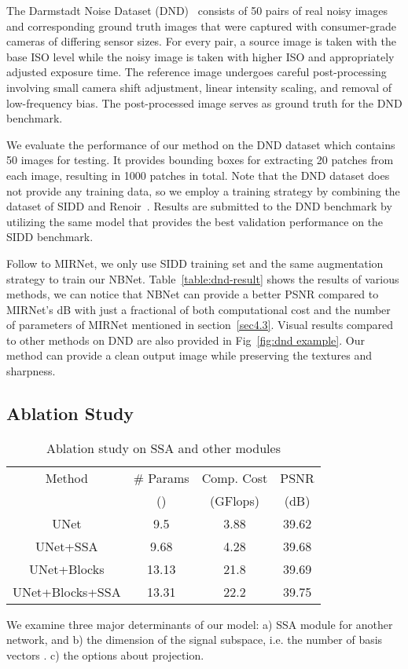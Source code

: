 \documentclass[final]{cvpr}
\begin{document}
The Darmstadt Noise Dataset (DND)~\cite{plotz2017benchmarking} consists of 50 pairs of real noisy images and corresponding ground truth images that were captured with consumer-grade cameras of differing sensor sizes. For every pair, a source image is taken with the base ISO level while the noisy image is taken with higher ISO and appropriately adjusted exposure time. The reference image undergoes careful post-processing involving small camera shift adjustment, linear intensity scaling, and removal of low-frequency bias. The post-processed image serves as ground truth for the DND benchmark.

We evaluate the performance of our method on the DND dataset which contains 50 images for testing. It provides bounding boxes for extracting 20 patches from each image, resulting in 1000 patches in total. Note that the DND dataset does not provide any training data, so we employ a training strategy by combining the dataset of SIDD and Renoir~\cite{anaya2014renoir}.  Results are submitted to the DND benchmark by utilizing the same model that provides the best validation performance on the SIDD benchmark.



Follow to MIRNet, we only use SIDD training set and the same augmentation strategy to train our NBNet. Table~\ref{table:dnd-result} shows the results of various methods, we can notice that NBNet can provide a better PSNR compared to MIRNet's  dB with just a fractional of both computational cost and the number of parameters of MIRNet mentioned in section~\ref{sec4.3}. Visual results compared to other methods on DND are also provided in Fig~\ref{fig:dnd example}. Our method can provide a clean output image while preserving the textures and sharpness.




\subsection{Ablation Study}

\begin{table}[t]
    \centering
    \begin{tabular}{cccc}
    \toprule
    Method & \# Params & Comp. Cost &PSNR \\
         & () & (GFlops) & (dB)\\
    \midrule
    UNet & 9.5 & 3.88 & 39.62\\
UNet+SSA & 9.68 & 4.28 & 39.68\\
UNet+Blocks & 13.13 & 21.8 & 39.69\\
UNet+Blocks+SSA & 13.31 & 22.2 & 39.75 \\
    \bottomrule
    \end{tabular}
    \caption{Ablation study on SSA and other modules}
    \label{tab:abl study}
\end{table} We examine three major determinants of our model: a) SSA module for another network, and b) the dimension of the signal subspace, i.e. the number of basis vectors . c) the options about projection.
\end{document}
